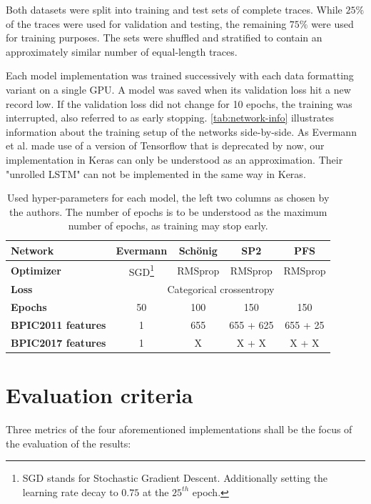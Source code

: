 Both datasets were split into training and test sets of complete traces. While $25\%$ of the traces were used for validation and testing, the remaining $75\%$ were used for training purposes. The sets were shuffled and stratified to contain an approximately similar number of equal-length traces.

Each model implementation was trained successively with each data formatting variant on a single GPU. A model was saved when its validation loss hit a new record low. If the validation loss did not change for 10 epochs, the training was interrupted, also referred to as early stopping. \autoref{tab:network-info} illustrates information about the training setup of the networks side-by-side. As Evermann et al. made use of a version of Tensorflow that is deprecated by now, our implementation in Keras can only be understood as an approximation. Their "unrolled LSTM" can not be implemented in the same way in Keras.

\begin{table}[ht!]
    \centering
    \begin{tabular}{lcccc}
        \textbf{Network} & Evermann & Schönig & SP2 & PFS\\
        \hline
        \textbf{Optimizer} & SGD\footnote{SGD stands for Stochastic Gradient Descent. Additionally setting the learning rate decay to $0.75$ at the $25^{th}$ epoch.} & RMSprop  & RMSprop & RMSprop\\
        \textbf{Loss}    &\multicolumn{4}{c}{Categorical crossentropy}\\
        \textbf{Epochs}  & 50 & 100 & 150 & 150\\
        \textbf{BPIC2011 features} & 1 & 655 & 655 + 625 & 655 + 25 \\
        \textbf{BPIC2017 features} & 1 & X & X + X & X + X \\
    \end{tabular}
    \caption{Used hyper-parameters for each model, the left two columns as chosen by the authors. The number of epochs is to be understood as the maximum number of epochs, as training may stop early.}
    \label{tab:network-info}
\end{table}

\section{Evaluation criteria}
\label{sec:eval:criteria}
Three metrics of the four aforementioned implementations shall be the focus of the evaluation of the results:

